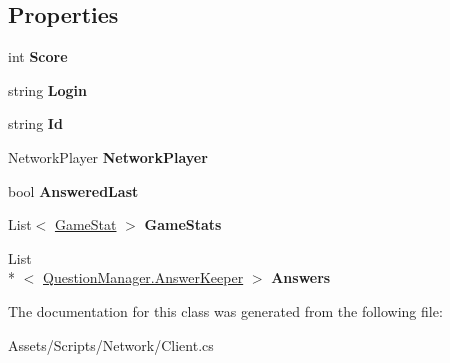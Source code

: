 \subsection*{Properties}
\begin{DoxyCompactItemize}
\item 
\hypertarget{class_client_a9e4b1c9a2eb1c42e368654bb99e9d6e6}{int {\bfseries Score}}\label{class_client_a9e4b1c9a2eb1c42e368654bb99e9d6e6}

\item 
\hypertarget{class_client_a2158332f099bc2a23adf724de4f404f6}{string {\bfseries Login}}\label{class_client_a2158332f099bc2a23adf724de4f404f6}

\item 
\hypertarget{class_client_abfc79ddafba117c34dc44c23a602b07a}{string {\bfseries Id}}\label{class_client_abfc79ddafba117c34dc44c23a602b07a}

\item 
\hypertarget{class_client_a9c05dcc33ad48ee39808801e92cba667}{Network\-Player {\bfseries Network\-Player}}\label{class_client_a9c05dcc33ad48ee39808801e92cba667}

\item 
\hypertarget{class_client_a274295bb29b198c4787fc38ad7027697}{bool {\bfseries Answered\-Last}}\label{class_client_a274295bb29b198c4787fc38ad7027697}

\item 
\hypertarget{class_client_a6bcdcc286b24d44de5ac8e0f7e659ba0}{List$<$ \hyperlink{class_game_stat}{Game\-Stat} $>$ {\bfseries Game\-Stats}}\label{class_client_a6bcdcc286b24d44de5ac8e0f7e659ba0}

\item 
\hypertarget{class_client_a31e6a52874e33141c7d296a3db3f0b10}{List\\*
$<$ \hyperlink{class_question_manager_1_1_answer_keeper}{Question\-Manager.\-Answer\-Keeper} $>$ {\bfseries Answers}}\label{class_client_a31e6a52874e33141c7d296a3db3f0b10}

\end{DoxyCompactItemize}


The documentation for this class was generated from the following file\-:\begin{DoxyCompactItemize}
\item 
Assets/\-Scripts/\-Network/Client.\-cs\end{DoxyCompactItemize}
